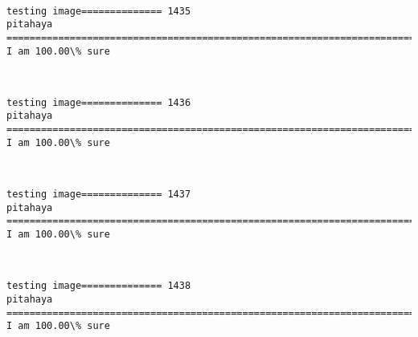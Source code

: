\documentclass[11pt]{article}
\begin{document}
    \begin{center}
    \end{center}
    { \hspace*{\fill} \\}
    
    \begin{Verbatim}[commandchars=\\\{\}]
testing image============== 1435
pitahaya
============================================================================
I am 100.00\% sure

    \end{Verbatim}

    \begin{center}
    \end{center}
    { \hspace*{\fill} \\}
    
    \begin{Verbatim}[commandchars=\\\{\}]
testing image============== 1436
pitahaya
============================================================================
I am 100.00\% sure

    \end{Verbatim}

    \begin{center}
    \end{center}
    { \hspace*{\fill} \\}
    
    \begin{Verbatim}[commandchars=\\\{\}]
testing image============== 1437
pitahaya
============================================================================
I am 100.00\% sure

    \end{Verbatim}

    \begin{center}
    \end{center}
    { \hspace*{\fill} \\}
    
    \begin{Verbatim}[commandchars=\\\{\}]
testing image============== 1438
pitahaya
============================================================================
I am 100.00\% sure

    \end{Verbatim}
\end{document}
